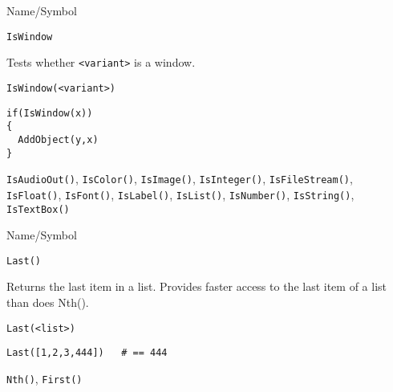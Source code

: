 \begin{desc}{Name/Symbol}
\item[Name/Symbol]	\verb+IsWindow+

\item[Description]	Tests whether \verb+<variant>+ is a window.

\item[Usage]		
\begin{verbatim}
IsWindow(<variant>)
\end{verbatim}

\item[Example]	
\begin{verbatim}
if(IsWindow(x))
{
  AddObject(y,x)
}
\end{verbatim}

\item[See Also] \verb+IsAudioOut()+, \verb+IsColor()+,
  \verb+IsImage()+, \verb+IsInteger()+, \verb+IsFileStream()+,
  \verb+IsFloat()+, \verb+IsFont()+, \verb+IsLabel()+,
  \verb+IsList()+, \verb+IsNumber()+, \verb+IsString()+,
  \verb+IsTextBox()+
\end{desc}

\vfill
\newpage
{}
\vfill


\begin{desc}{Name/Symbol}
\item[Name/Symbol]	\verb+Last()+

\item[Description]	Returns the last item in a list. Provides faster 
		access to the last item of a list than does Nth().

\item[Usage]
\begin{verbatim}
Last(<list>)
\end{verbatim}

\item[Example]
\begin{verbatim}
Last([1,2,3,444])	# == 444
\end{verbatim}

\item[See Also]	\verb+Nth()+, \verb+First()+
\end{desc}




